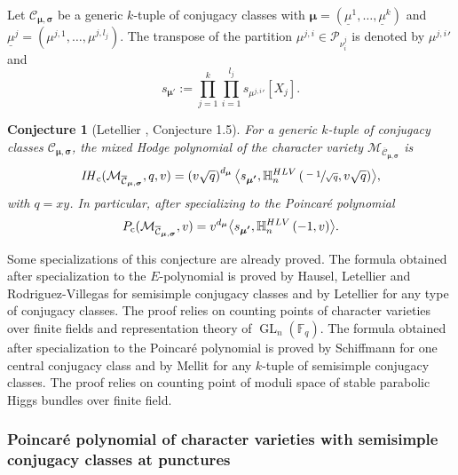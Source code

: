 \documentclass[11pt]{article}
\newcommand{\rc}{\mathrm{c}}
\newcommand{\HLV}{\textup{HLV}}
\newcommand{\blangle}{\bigl\langle}
\newcommand{\brangle}{\bigr\rangle}
\theoremstyle{definition}
\theoremstyle{plain}
\newtheorem{conjecture}[definition]{Conjecture}
\DeclareMathOperator{\GL}{GL}
\newcommand{\IH}{\mathit{IH}}
\newcommand{\Part}{\mathcal{P}}
\begin{document}
Let $\mathcal{C}_{\boldsymbol{\mu},\boldsymbol{\sigma}}$ be a generic $k$-tuple of conjugacy classes with $\boldsymbol{\mu}=(\underline{\mu}^1,\dots,\underline{\mu}^k)$ and $\underline{\mu}^j=\left(\mu^{j,1},\dots,\mu^{j,l_j}\right)$. The transpose of the partition $\mu^{j,i}\in \Part_{\nu^j_i}$ is denoted by ${\mu^{j,i}}'$ and
\begin{equation}\label{eq_s_boldmu}
s_{\boldsymbol{\mu'}}:=\prod_{j=1}^k \prod_{i=1}^{l_j} s_{ {\mu^{j,i}}' }[X_j].
\end{equation}
\begin{conjecture}[Letellier \cite{Letellier13}, Conjecture 1.5]\label{conjecture_ic_char}
For a generic $k$-tuple of conjugacy classes $\mathcal{C}_{\boldsymbol{\mu},\boldsymbol{\sigma}}$, the mixed Hodge polynomial of the character variety $\mathcal{M}_{\overline{\mathcal{C}}_{\boldsymbol{\mu},\boldsymbol{\sigma}}}$ is
\[
\IH_\rc (\mathcal{M}_{\overline{\mathcal{C}}_{\boldsymbol{\mu},\boldsymbol{\sigma}}}, q, v) = \left(v \sqrt{q}\right)^{d_{\boldsymbol{\mu}}} \blangle s_{\boldsymbol{\mu'}}, \mathbb{H}_n^{\HLV}\left(\sfrac{-1}{\sqrt{q}},v\sqrt{q}\right)\brangle,
\]
with $q=x y$. In particular, after specializing to the Poincaré polynomial
\begin{equation}\label{eq_poincare_poly}
P_{\rc} (\mathcal{M}_{\overline{\mathcal{C}}_{\boldsymbol{\mu},\boldsymbol{\sigma}}}, v) = v^{d_{\boldsymbol{\mu}}}\blangle s_{\boldsymbol{\mu'}}, \mathbb{H}_n^{\HLV}\left(-1,v\right)\brangle.
\end{equation}
\end{conjecture}

Some specializations of this conjecture are already proved. The formula obtained after specialization to the $E$-polynomial is proved by Hausel, Letellier and Rodriguez-Villegas \cite{Hausel_Letellier_Villegas} for semisimple conjugacy classes and by Letellier \cite{Letellier13} for any type of conjugacy classes.
The proof relies on counting points of character varieties over finite fields and representation theory of $\GL_n(\mathbb{F}_q)$.
The formula obtained after specialization to the Poincaré polynomial is proved by Schiffmann \cite{Schiffmann16} for one central conjugacy class and by Mellit \cite{Mellit2020} for any $k$-tuple of semisimple conjugacy classes.
The proof relies on counting point of moduli space of stable parabolic Higgs bundles over finite field.

\subsubsection{Poincaré polynomial of character varieties with semisimple conjugacy classes at punctures}\label{subsect_poincare_ss}
\end{document}
